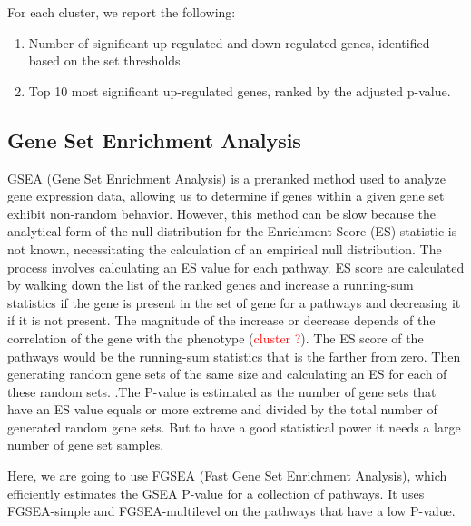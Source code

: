 \documentclass[a4paper, 11pt]{article}
\begin{document}
\begin{multicols}{2}
For each cluster, we report the following:
\begin{enumerate}
    \item Number of significant up-regulated and down-regulated genes, identified based on the set thresholds.
    \item Top 10 most significant up-regulated genes, ranked by the adjusted p-value.
\end{enumerate}\subsection{Gene Set Enrichment Analysis}
GSEA (Gene Set Enrichment Analysis) is a preranked method used to analyze gene expression data, allowing us to determine if genes within a given gene set exhibit non-random behavior. However, this method can be slow because the analytical form of the null distribution for the Enrichment Score (ES) statistic is not known, necessitating the calculation of an empirical null distribution.
The process involves calculating an ES value for each pathway. ES score are calculated by walking down the list of the ranked genes and increase a running-sum statistics if the gene is present in the set of gene for  a pathways and decreasing it if it is not present. The magnitude of the increase or decrease  depends of the correlation of the gene with the phenotype (\textcolor{red} {cluster ?}). The ES score of the pathways would be the running-sum statistics that is the farther from zero. 
Then generating random gene sets of the same size and calculating an ES for each of these random sets. .The P-value is estimated as the number of gene sets that have an ES value equals or more extreme and divided by the total number of generated random gene sets. But to have a good statistical power it needs a large number of gene set samples.

Here, we are going to use FGSEA (Fast Gene Set Enrichment Analysis), which efficiently estimates the GSEA P-value for a collection of pathways. It uses FGSEA-simple and FGSEA-multilevel on the pathways that have a low P-value.


\end{multicols}
\end{document}
